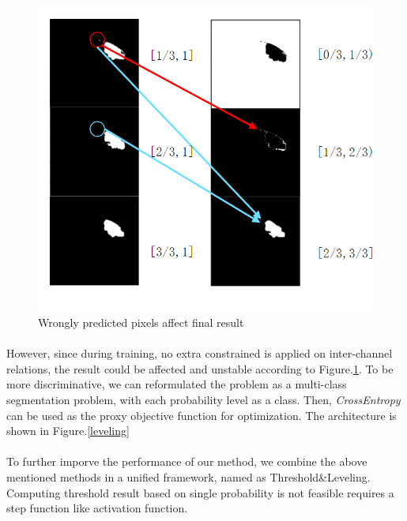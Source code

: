 \documentclass[12pt]{extarticle}
\begin{document}
\begin{figure}[ht!]
\centering
\includegraphics[scale=0.3]{fig7.png}
\caption{Wrongly predicted pixels affect final result}
\label{WrongResult}
\end{figure}
\paragraph{}
However, since during training, no extra constrained is applied on inter-channel relations, the result could be 
affected and unstable according to Figure.\ref{WrongResult}. To be more discriminative, we can reformulated the 
problem as a multi-class segmentation problem, with each probability level as a class. Then, \textit{CrossEntropy} can 
be used as the proxy objective function for optimization. The architecture is shown in Figure.\ref{leveling}
\paragraph{}
To further imporve the performance of our method, we combine the above mentioned methods in a unified framework, named as Threshold\&Leveling.
Computing threshold result based on single probability is not feasible requires a step function like activation function.
\end{document}
